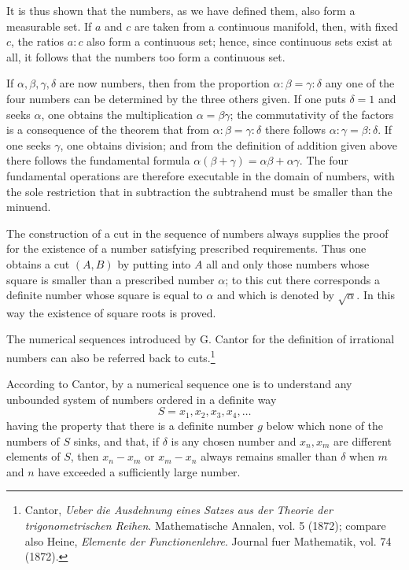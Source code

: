 \documentclass[11pt]{article}
\begin{document}
It is thus shown that the numbers, as we have defined them, also form a measurable set. If $a$ and $c$ are taken from a continuous manifold, then, with fixed $c$, the ratios $a:c$ also form a continuous set; hence, since continuous sets exist at all, it follows that the numbers too form a continuous set.

If $\alpha,\beta,\gamma,\delta$ are now numbers, then from the proportion $\alpha:\beta=\gamma:\delta$ any one of the four numbers can be determined by the three others given. If one puts $\delta=1$ and seeks $\alpha$, one obtains the multiplication $\alpha=\beta\gamma$; the commutativity of the factors is a consequence of the theorem that from $\alpha:\beta=\gamma:\delta$ there follows $\alpha:\gamma=\beta:\delta$. If one seeks $\gamma$, one obtains division; and from the definition of addition given above there follows the fundamental formula $\alpha(\beta+\gamma)=\alpha\beta+\alpha\gamma$. The four fundamental operations are therefore executable in the domain of numbers, with the sole restriction that in subtraction the subtrahend must be smaller than the minuend.

The construction of a cut in the sequence of numbers always supplies the proof for the existence of a number satisfying prescribed requirements. Thus one obtains a cut $(A,B)$ by putting into $A$ all and only those numbers whose square is smaller than a prescribed number $\alpha$; to this cut there corresponds a definite number whose square is equal to $\alpha$ and which is denoted by $\sqrt\alpha$. In this way the existence of square roots is proved.

The numerical sequences introduced by G. Cantor for the definition of irrational numbers can also be referred back to cuts.\footnote{Cantor, \emph{Ueber die Ausdehnung eines Satzes aus der Theorie der trigonometrischen Reihen}. Mathematische Annalen, vol. 5 (1872); compare also Heine, \emph{Elemente der Functionenlehre}. Journal fuer Mathematik, vol. 74 (1872).}

According to Cantor, by a numerical sequence one is to understand any unbounded system of numbers ordered in a definite way
\[
 S=x_1,x_2,x_3,x_4,\ldots
\]
having the property that there is a definite number $g$ below which none of the numbers of $S$ sinks, and that, if $\delta$ is any chosen number and $x_n,x_m$ are different elements of $S$, then $x_n-x_m$ or $x_m-x_n$ always remains smaller than $\delta$ when $m$ and $n$ have exceeded a sufficiently large number.
\end{document}
